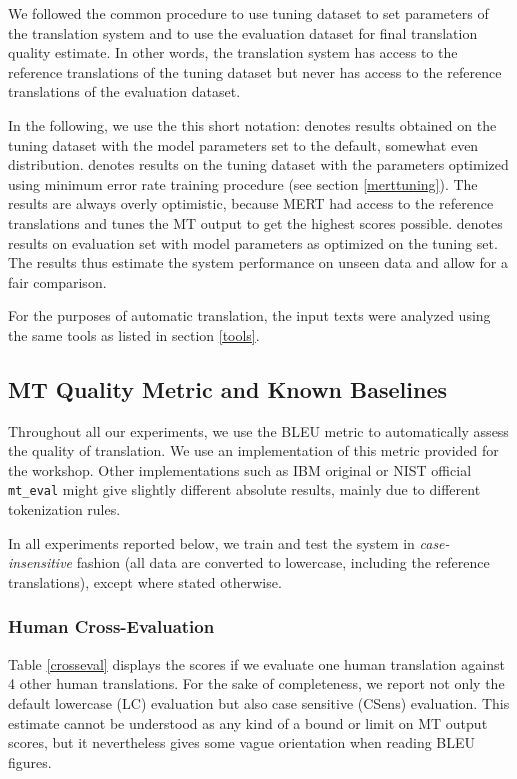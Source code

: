 \documentclass[11pt]{report}
\theoremstyle{plain}
\begin{document}
{{We followed the common procedure to use tuning dataset to set parameters of the
translation system and to use the evaluation dataset for final translation
quality estimate. In other words, the translation system has access to the
reference translations of the tuning dataset but never has access to the
reference translations of the evaluation dataset.

In the following, we use the this short notation:  denotes
results obtained on the tuning dataset with the model parameters set to the
default, somewhat even distribution.  denotes results on the
tuning dataset with the parameters optimized using minimum error rate training
procedure (see section \ref{merttuning}). The  results are always overly
optimistic, because MERT had access to the reference translations and tunes the
MT output to get the highest scores possible.  denotes results on evaluation set with model parameters as optimized on
the tuning set. The  results thus estimate the system
performance on unseen data and allow for a fair comparison.

For the purposes of automatic translation, the input texts were analyzed using
the same tools as listed in section \ref{tools}.



\subsection{MT Quality Metric and Known Baselines}
\label{baselines}

Throughout all our experiments, we use the BLEU metric 
to automatically assess the quality of translation. We use an implementation of
this metric provided for the workshop. Other implementations such as IBM
original or NIST official {\tt mt\_eval} might give slightly
different absolute results, mainly due to different tokenization rules.

In all experiments reported below, we train and test the system in
\emph{case-insensitive} fashion (all data are converted to lowercase, including
the reference translations), except where stated otherwise.



\subsubsection{Human Cross-Evaluation}

Table \ref{crosseval} displays the scores if we evaluate one human translation
against 4 other human translations. For the sake of completeness, we report not
only the default lowercase (LC) evaluation but also case sensitive (CSens)
evaluation. This estimate cannot be understood as any kind of a bound or limit
on MT output scores, but it nevertheless gives some vague orientation when
reading BLEU figures.

}}
\end{document}
